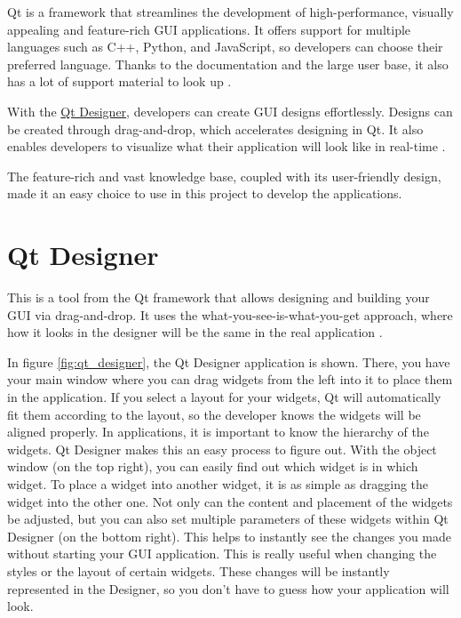 Qt is a framework that streamlines the development of high-performance, visually appealing and feature-rich GUI applications. 
It offers support for multiple languages such as C++, Python, and JavaScript, so developers can choose their preferred language.
Thanks to the documentation and the large user base, it also has a lot of support material to look up \cite{qt}.

With the \hyperref[sub:qt_designer]{Qt Designer}, developers can create GUI designs effortlessly.
Designs can be created through drag-and-drop, which accelerates designing in Qt. 
It also enables developers to visualize what their application will look like in real-time \cite{qt}.

The feature-rich and vast knowledge base, coupled with its user-friendly design, made it 
an easy choice to use in this project to develop the applications.


\section{Qt Designer}
\label{sub:qt_designer}

This is a tool from the Qt framework that allows designing and building your GUI via drag-and-drop. 
It uses the what-you-see-is-what-you-get approach, where how it looks in the designer will be the 
same in the real application \cite{qt}.

In figure \ref{fig:qt_designer}, the Qt Designer application is shown. There, you have your main 
window where you can drag widgets from the left into it to place them in the application. If you 
select a layout for your widgets, Qt will automatically fit them according to the layout, so the 
developer knows the widgets will be aligned properly. In applications, it is important to know the 
hierarchy of the widgets. Qt Designer makes this an easy process to figure out. With the object 
window (on the top right), you can easily find out which widget is in which widget. To place a 
widget into another widget, it is as simple as dragging the widget into the other one. Not only 
can the content and placement of the widgets be adjusted, but you can also set multiple parameters 
of these widgets within Qt Designer (on the bottom right). This helps to instantly see the changes you made without 
starting your GUI application. This is really useful when changing the styles or the layout of 
certain widgets. These changes will be instantly represented in the Designer, so you don't have 
to guess how your application will look.

